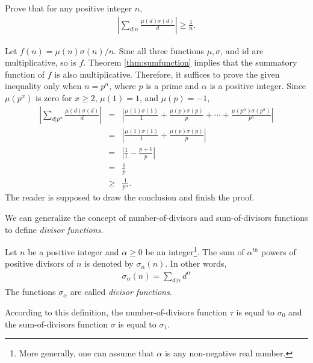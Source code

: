 \documentclass[12pt]{subfile}
\begin{document}
	\begin{problem}
		Prove that for any positive integer $n$, 
			\begin{align*}
				\left|\sum_{d|n}\frac{\mu(d)\sigma(d)}{d}\right| \geq \frac{1}{n}.
			\end{align*}
	\end{problem}
	
	\begin{solution}
		Let $f(n)=\mu(n)\sigma(n)/n$. Sine all three functions $\mu, \sigma$, and $\text{id}$ are multiplicative, so is $f$. Theorem \eqref{thm:sumfunction} implies that the summatory function of $f$ is also multiplicative. Therefore, it suffices to prove the given inequality only when $n=p^\alpha$, where $p$ is a prime and $\alpha$ is a positive integer. Since $\mu(p^x)$ is zero for $x \geq 2$, $\mu(1)=1$, and $\mu(p)=-1$, 
			\begin{eqnarray*}
				\left|\sum_{d|p^\alpha}\frac{\mu(d)\sigma(d)}{d}\right| 
						&=& \left|\frac{\mu(1)\sigma(1)}{1} + \frac{\mu(p)\sigma(p)}{p} + \cdots + \frac{\mu(p^\alpha)\sigma(p^a)}{p^a}\right| \\
						&=& \left|\frac{\mu(1)\sigma(1)}{1} + \frac{\mu(p)\sigma(p)}{p}\right|\\
						&=& \left|\frac{1}{1} - \frac{p+1}{p}\right|\\
						&=& \frac{1}{p}\\
						&\geq& \frac{1}{p^\alpha}.
			\end{eqnarray*} 
		The reader is supposed to draw the conclusion and finish the proof.
	\end{solution}
	
	
	
We can generalize the concept of number-of-divisors and sum-of-divisors functions to define \textit{divisor functions}.

	\begin{definition}
		Let $n$ be a positive integer and $\alpha \geq 0$ be an integer\footnote{More generally, one can assume that $\alpha$ is any non-negative real number.}. The sum of $\alpha^{th}$ powers of positive divisors of $n$ is denoted by $\sigma_\alpha(n)$. In other words, 
			\begin{align*}
				\sigma_\alpha(n) = \sum_{d|n} d^\alpha
			\end{align*}
		The functions $\sigma_\alpha$ are called \textit{divisor functions}.
	\end{definition}
	
According to this definition, the number-of-divisors function $\tau$ is equal to $\sigma_0$ and the sum-of-divisors function $\sigma$ is equal to $\sigma_1$.
	
\end{document}
